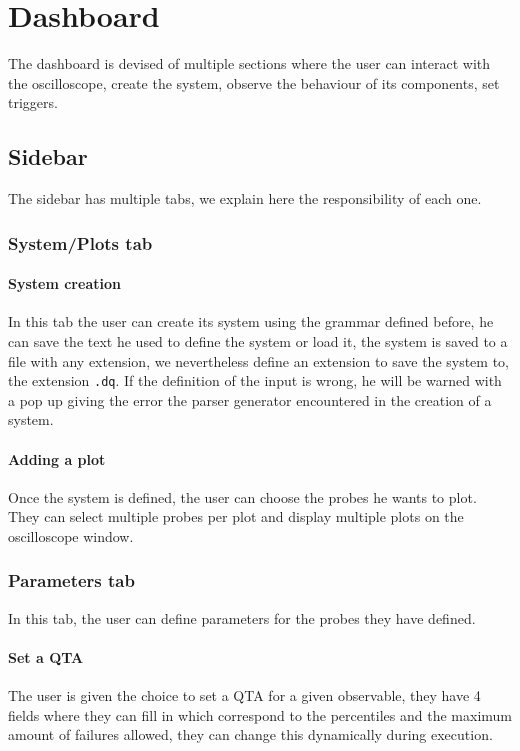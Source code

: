 \section{Dashboard}
    The dashboard is devised of multiple sections where the user can interact with the oscilloscope, create the system, observe the behaviour of its components, set triggers.

    \subsection{Sidebar}
        The sidebar has multiple tabs, we explain here the responsibility of each one.

    \subsubsection{System/Plots tab}

    \paragraph{System creation}
        In this tab the user can create its system using the grammar defined before, he can save the text he used to define the system or load it, the system is saved to a file with any extension, we nevertheless define an extension to save the system to, the extension \texttt{.dq}.
        If the definition of the input is wrong, he will be warned with a pop up giving the error the parser generator encountered in the creation of a system.

    \paragraph{Adding a plot}
        Once the system is defined, the user can choose the probes he wants to plot. They can select multiple probes per plot and display multiple plots on the oscilloscope window.

    \subsubsection{Parameters tab}
        In this tab, the user can define parameters for the probes they have defined.

    \paragraph{Set a QTA}
        The user is given the choice to set a QTA for a given observable, they have 4 fields where they can fill in which correspond to the percentiles and the maximum amount of failures allowed, they can change this dynamically during execution.

